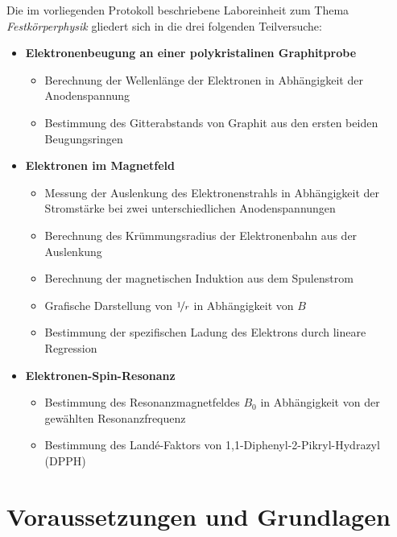 \documentclass[ngerman]{scrartcl}
\begin{document}
Die im vorliegenden Protokoll beschriebene Laboreinheit zum Thema \textit{Festkörperphysik} gliedert sich in die drei folgenden Teilversuche:
%
\begin{itemize}
    \item \textbf{Elektronenbeugung an einer polykristalinen Graphitprobe}
          \begin{itemize}
              \item Berechnung der Wellenlänge der Elektronen in Abhängigkeit der Anodenspannung
              \item Bestimmung des Gitterabstands von Graphit aus den ersten beiden Beugungsringen
          \end{itemize}
    \item \textbf{Elektronen im Magnetfeld}
          \begin{itemize}
              \item Messung der Auslenkung des Elektronenstrahls in Abhängigkeit der Stromstärke bei zwei unterschiedlichen Anodenspannungen
              \item Berechnung des Krümmungsradius der Elektronenbahn aus der Auslenkung
              \item Berechnung der magnetischen Induktion aus dem Spulenstrom
              \item Grafische Darstellung von $\nicefrac{1}{r}$ in Abhängigkeit von $B$
              \item Bestimmung der spezifischen Ladung des Elektrons durch lineare Regression
          \end{itemize}
    \item \textbf{Elektronen-Spin-Resonanz}
          \begin{itemize}
              \item Bestimmung des Resonanzmagnetfeldes $B_0$ in Abhängigkeit von der gewählten Resonanzfrequenz
              \item Bestimmung des Landé-Faktors von 1,1-Diphenyl-2-Pikryl-Hydrazyl (DPPH)
          \end{itemize}

\end{itemize}



\section[Voraussetzungen und Grundlagen]{Voraussetzungen und Grundlagen \cite{ref:angabe}}
\label{sec:voraussetzungen_grundlagen}
\end{document}
